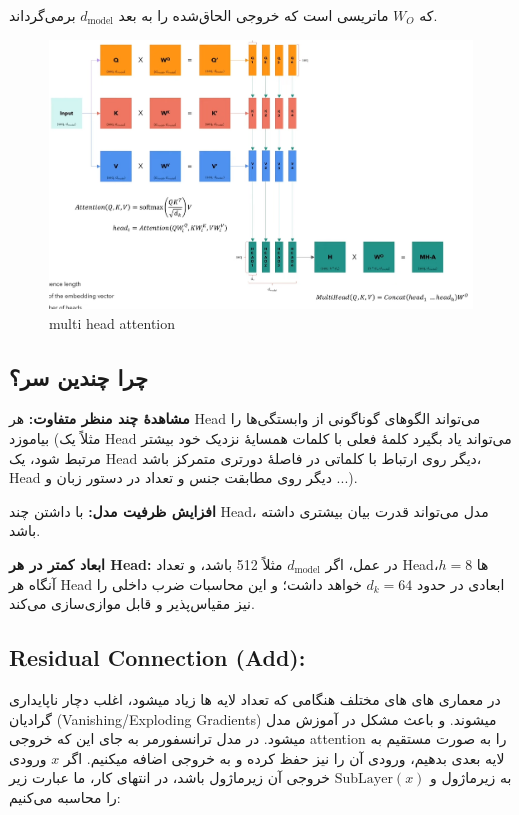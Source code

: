 که \( W_O \) ماتریسی است که خروجی الحاق‌شده را به بعد \( d_{\text{model}} \) برمی‌گرداند.





\begin{figure}[h]
	\centering
	\begin{minipage}[b]{0.9\textwidth}
		\centering
		\includegraphics[width=\textwidth]{transformer_images/multi_head_attention.png}
		\caption{multi head attention}
		\label{fig:attention}
	\end{minipage}
	\hfill
	
\end{figure}



\subsection*{چرا چندین سر؟}

\textbf{مشاهدهٔ چند منظر متفاوت:} هر Head می‌تواند الگوهای گوناگونی از وابستگی‌ها را بیاموزد (مثلاً یک Head می‌تواند یاد بگیرد کلمهٔ فعلی با کلمات همسایهٔ نزدیک خود بیشتر مرتبط شود، یک Head دیگر روی ارتباط با کلماتی در فاصلهٔ دورتری متمرکز باشد، Head دیگر روی مطابقت جنس و تعداد در دستور زبان و ...).

\textbf{افزایش ظرفیت مدل:} با داشتن چند Head، مدل می‌تواند قدرت بیان بیشتری داشته باشد.

\textbf{ابعاد کمتر در هر Head:} در عمل، اگر \( d_{\text{model}} \) مثلاً 512 باشد، و تعداد Headها \( h = 8 \)، آنگاه هر Head ابعادی در حدود \( d_k = 64 \) خواهد داشت؛ و این محاسبات ضرب داخلی را نیز مقیاس‌پذیر و قابل موازی‌سازی می‌کند.


\subsection{Residual Connection (Add):}
در معماری های های مختلف هنگامی که تعداد لایه ها زیاد  میشود، اغلب دچار ناپایداری گرادیان (Vanishing/Exploding Gradients) میشوند. و باعث مشکل در آموزش مدل میشود.
در مدل ترانسفورمر به جای این که خروجی attention  را به صورت مستقیم به لایه بعدی بدهیم، ورودی آن را نیز حفظ کرده و به خروجی اضافه میکنیم.
اگر \( x \) ورودی به زیرماژول و \( \text{SubLayer}(x) \) خروجی آن زیرماژول باشد، در انتهای کار، ما عبارت زیر را محاسبه می‌کنیم:


